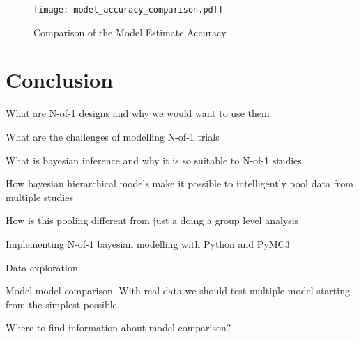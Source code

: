 \documentclass[12pt,a4paper,leqno]{report}
\theoremstyle{plain}
\theoremstyle{definition}
\theoremstyle{remark}
\begin{document}
\bigskip
\begin{figure}[H]
    \caption{Comparison of the Model Estimate Accuracy}\label{modelaccuracycomparison}
    \bigskip
    \texttt{[image: model\_accuracy\_comparison.pdf]}
\end{figure}
\bigskip

\chapter{Conclusion}



What are N-of-1 designs and why we would want to use them

What are the challenges of modelling N-of-1 trials

What is bayesian inference and why it is so suitable to N-of-1 studies

How bayesian hierarchical models make it possible to intelligently pool data from
multiple studies

How is this pooling different from just a doing a group level analysis

Implementing N-of-1 bayesian modelling with Python and PyMC3


Data exploration

Model model comparison. With real data we should test multiple model starting from the
simplest possible.

Where to find information about model comparison?

\end{document}
